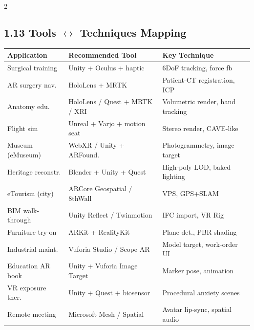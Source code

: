 \begin{paracol}{2}
\subsection*{1.13 Tools $\leftrightarrow$ Techniques Mapping}
{\scriptsize
\begin{tabular}{@{}p{2.1cm}p{2.6cm}p{2.4cm}@{}}
\toprule
\textbf{Application} & \textbf{Recommended Tool} & \textbf{Key Technique} \\
\midrule
Surgical training & Unity + Oculus + haptic & 6DoF tracking, force fb \\
AR surgery nav. & HoloLens + MRTK & Patient-CT registration, ICP \\
Anatomy edu. & HoloLens / Quest + MRTK / XRI & Volumetric render, hand tracking \\
Flight sim & Unreal + Varjo + motion seat & Stereo render, CAVE-like \\
Museum (eMuseum) & WebXR / Unity + ARFound. & Photogrammetry, image target \\
Heritage reconstr. & Blender + Unity + Quest & High-poly LOD, baked lighting \\
eTourism (city) & ARCore Geospatial / 8thWall & VPS, GPS+SLAM \\
BIM walk-through & Unity Reflect / Twinmotion & IFC import, VR Rig \\
Furniture try-on & ARKit + RealityKit & Plane det., PBR shading \\
Industrial maint. & Vuforia Studio / Scope AR & Model target, work-order UI \\
Education AR book & Unity + Vuforia Image Target & Marker pose, animation \\
VR exposure ther. & Unity + Quest + biosensor & Procedural anxiety scenes \\
Remote meeting & Microsoft Mesh / Spatial & Avatar lip-sync, spatial audio \\
\bottomrule
\end{tabular}}

\switchcolumn


\end{paracol}
